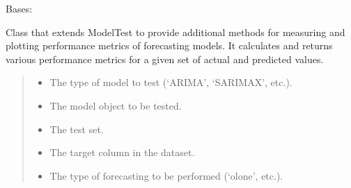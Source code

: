 \documentclass[letterpaper,10pt,english]{sphinxmanual}
\begin{document}
\begin{fulllineitems}
\label{\detokenize{docs/performance_measurement:performance_measurement.PerfMeasure}}
\pysigstartsignatures
{}
\pysigstopsignatures
\sphinxAtStartPar
Bases: 

\sphinxAtStartPar
Class that extends ModelTest to provide additional methods for measuring and plotting performance
metrics of forecasting models. It calculates and returns various performance metrics
for a given set of actual and predicted values.
\begin{quote}\begin{description}
\begin{itemize}
\item {} 
\sphinxAtStartPar
{} \textendash{} The type of model to test (‘ARIMA’, ‘SARIMAX’, etc.).

\item {} 
\sphinxAtStartPar
{} \textendash{} The model object to be tested.

\item {} 
\sphinxAtStartPar
{} \textendash{} The test set.

\item {} 
\sphinxAtStartPar
{} \textendash{} The target column in the dataset.

\item {} 
\sphinxAtStartPar
{} \textendash{} The type of forecasting to be performed (‘ol\sphinxhyphen{}one’, etc.).

\end{itemize}

\end{description}\end{quote}


\end{fulllineitems}
\end{document}

